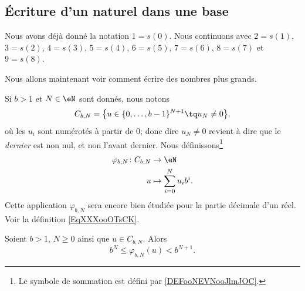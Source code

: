 \subsection{Écriture d'un naturel dans une base}
\label{SUBooEcritureNaturels}

\begin{normaltext}	\label{NORooEcritureChiffres}
	Nous avons déjà donné la notation \( 1=s(0)\). Nous continuons avec \( 2=s(1)\), \( 3=s(2)\), \( 4=s(3)\), \( 5=s(4)\), \( 6=s(5)\), \( 7=s(6)\), \( 8=s(7)\) et \( 9=s(8)\).

	Nous allons maintenant voir comment écrire des nombres plus grands.
\end{normaltext}

\begin{normaltext}	\label{NORooTuplesChiffres}
	Si \( b>1\) et \( N\in \eN\) sont donnés, nous notons
	\begin{equation}
		C_{b,N}=\big\{  u\in \{ 0,\ldots, b-1 \}^{N+1}\tq u_N\neq 0  \big\}.
	\end{equation}
	où les \( u_i\) sont numérotés à partir de \( 0\); donc dire \( u_N\neq 0\) revient à dire que le \emph{dernier} est non nul, et non l'avant dernier. Nous définissons\footnote{Le symbole de sommation est défini par \ref{DEFooNEVNooJlmJOC}.}
	\begin{equation}        \label{EQooWWTUooHAnSEv}
		\begin{aligned}
			\varphi_{b,N}\colon C_{b,N} & \to \eN                     \\
			u                           & \mapsto \sum_{i=0}^Nu_ib^i.
		\end{aligned}
	\end{equation}
	Cette application \( \varphi_{b,N}\) sera encore bien étudiée pour la partie décimale d'un réel. Voir la définition \ref{EqXXXooOTsCK}.
\end{normaltext}

\begin{lemma}       \label{LEMooJUGKooGsbrhi}
	Soient \( b>1\), \( N\geq 0\) ainsi que \( u\in C_{b,N}\). Alors
	\begin{equation}        \label{EQooYHTLooNwqIIq}
		b^N\leq \varphi_{b,N}(u)<b^{N+1}.
	\end{equation}
\end{lemma}

